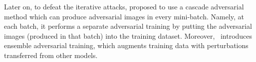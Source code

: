 Later on, to defeat the iterative attacks, \cite{na2017cascade} proposed to use a cascade adversarial method which can produce adversarial images in every mini-batch. Namely, at each batch, it performs a separate adversarial training by putting the adversarial images (produced in that batch) into the training dataset.
Moreover,~\cite{tramer2017ensemble} introduces ensemble adversarial training, which augments training data with perturbations transferred from other models. 


